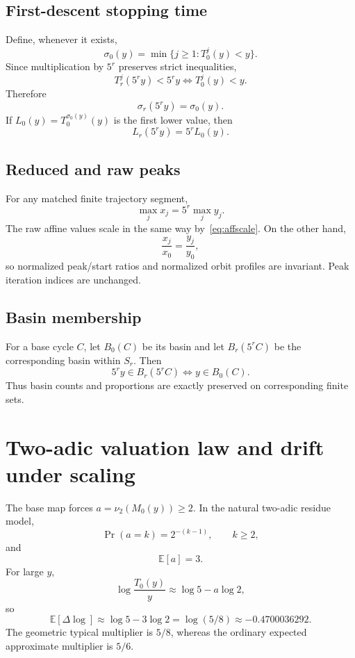 \documentclass[11pt]{article}
\newcommand{\vTwo}{\nu_2}
\begin{document}
\subsection{First-descent stopping time}
Define, whenever it exists,
\[
\sigma_0(y)=\min\{j\ge1:T_0^j(y)<y\}.
\]
Since multiplication by $5^r$ preserves strict inequalities,
\[
T_r^j(5^ry)<5^ry\iff T_0^j(y)<y.
\]
Therefore
\begin{equation}
\sigma_r(5^ry)=\sigma_0(y).
\label{eq:firstdescent}
\end{equation}
If $L_0(y)=T_0^{\sigma_0(y)}(y)$ is the first lower value, then
\begin{equation}
L_r(5^ry)=5^rL_0(y).
\label{eq:firstlower}
\end{equation}

\subsection{Reduced and raw peaks}
For any matched finite trajectory segment,
\begin{equation}
\max_j x_j=5^r\max_j y_j.
\label{eq:peakscale}
\end{equation}
The raw affine values scale in the same way by~\eqref{eq:affscale}. On the other hand,
\begin{equation}
\frac{x_j}{x_0}=\frac{y_j}{y_0},
\label{eq:normratio}
\end{equation}
so normalized peak/start ratios and normalized orbit profiles are invariant. Peak iteration indices are unchanged.

\subsection{Basin membership}
For a base cycle $C$, let $B_0(C)$ be its basin and let $B_r(5^rC)$ be the corresponding basin within $S_r$. Then
\begin{equation}
5^ry\in B_r(5^rC)\iff y\in B_0(C).
\label{eq:basin}
\end{equation}
Thus basin counts and proportions are exactly preserved on corresponding finite sets.

\section{Two-adic valuation law and drift under scaling}
The base map forces $a=\vTwo(M_0(y))\ge2$. In the natural two-adic residue model,
\begin{equation}
\Pr(a=k)=2^{-(k-1)},\qquad k\ge2,
\end{equation}
and
\begin{equation}
\mathbb E[a]=3.
\end{equation}
For large $y$,
\[
\log\frac{T_0(y)}y\approx\log5-a\log2,
\]
so
\begin{equation}
\mathbb E[\Delta\log]\approx\log5-3\log2=\log(5/8)\approx-0.4700036292.
\label{eq:drift}
\end{equation}
The geometric typical multiplier is $5/8$, whereas the ordinary expected approximate multiplier is $5/6$.
\end{document}
